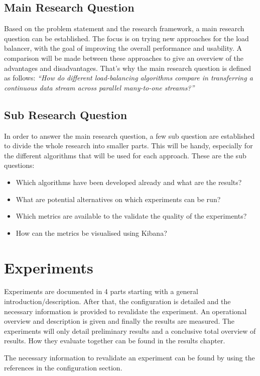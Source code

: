 \documentclass[]{article}
\begin{document}
\subsection{Main Research Question}
Based on the problem statement and the research framework, a main research question can be established. The focus is on trying new approaches for the load balancer, with the goal of improving the overall performance and usability. A comparison will be made between these approaches to give an overview of the advantages and disadvantages. That’s why the main research question is defined as follows: \textit{“How do different load-balancing algorithms compare in transferring a continuous data stream across parallel many-to-one streams?”}

\subsection{Sub Research Question}
In order to answer the main research question, a few sub question are established to divide the whole research into smaller parts. This will be handy, especially for the different algorithms that will be used for each approach. These are the sub questions:
\begin{itemize}
	\itemsep 0em
	\item Which algorithms have been developed already and what are the results?
	\item What are potential alternatives on which experiments can be run?
	\item Which metrics are available to the validate the quality of the experiments?
	\item How can the metrics be visualised using Kibana?
\end{itemize}


\section{Experiments}
Experiments are documented in 4 parts starting with a general introduction/description. After that, the configuration is detailed and the necessary information is provided to revalidate the experiment. An operational overview and description is given and finally the results are measured. The experiments will only detail preliminary results and a conclusive total overview of results. How they evaluate together can be found in the results chapter. 

The necessary information to revalidate an experiment can be found by using the references in the configuration section.
\end{document}
